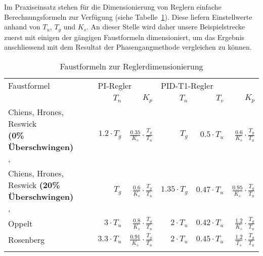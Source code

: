 Im  Praxiseinsatz  stehen  f\"ur  die  Dimensionierung  von  Reglern  einfache
Berechnungsformeln  zur  Verf\"ugung  (siehe  Tabelle~\ref{tab:faustformeln}).
Diese  liefern Einstellwerte  anhand  von $T_u$,  $T_g$  und $K_s$. An  dieser
Stelle wird  daher unsere  Beispielstrecke zuerst  mit einigen  der g\"angigen
Faustformeln dimensioniert, um das Ergebnis anschliessend mit dem Resultat der
Phasengangmethode vergleichen zu k\"onnen.

\begin{longtable}{p{50mm}rrrrr}
    \toprule


    Faustformel
    &
    \multicolumn{2}{l}{PI-Regler}
    &
    \multicolumn{2}{l}{PID-T1-Regler}
    \\

    &
    $T_n$
    &
    $K_p$
    &
    $T_n$
    &
    $T_v$
    &
    $K_p$
    \\

    \midrule

    \endhead
    \endfoot
    \endlastfoot


    \pbox{45mm}{Chiens, Hrones, Reswick \\ \small{\textbf{(0\% \"Uberschwingen)}} \\ \cite{ref:chiens_tsn}, \cite{ref:chiens_wiki}}
    &
    $1.2\cdot T_g$
    &
    $\frac{0.35}{K_s} \cdot \frac{T_g}{T_u}$
    &
    $T_g$
    &
    $0.5\cdot T_u$
    &
    $ \frac{0.6}{K_s} \cdot \frac{T_g}{T_u} $
    \\

    \addlinespace[1em]

    \pbox{45mm}{Chiens, Hrones, Reswick \small{\textbf{(20\% \"Uberschwingen)}} \\ \cite{ref:chiens_tsn}, \cite{ref:chiens_wiki}}
    &
    $T_g$
    &
    $\frac{0.6}{K_s} \cdot \frac{T_g}{T_u}$
    &
    $1.35\cdot T_g$
    &
    $0.47 \cdot T_u$
    &
    $ \frac{0.95}{K_s} \cdot \frac{T_g}{T_u} $
    \\

    \addlinespace[1em]

    Oppelt \cite{ref:op_ros_zieg}
    &
    $3 \cdot T_u$
    &
    $\frac{0.8}{K_s} \cdot \frac{T_g}{T_u}$
    &
    $2 \cdot T_u$
    &
    $ 0.42 \cdot T_u $
    &
    $ \frac{1.2}{K_s} \cdot \frac{T_g}{T_u} $
    \\

    \addlinespace[1em]

    Rosenberg \cite{ref:op_ros_zieg}
    &
    $3.3 \cdot T_u $
    &
    $ \frac{0.91}{K_s} \cdot \frac{T_g}{T_u} $
    &
    $ 2 \cdot T_u $
    &
    $ 0.45 \cdot T_u $
    &
    $ \frac{1.2}{T_s} \cdot \frac{T_g}{T_u}$
    \\

    \addlinespace[1em]

    \bottomrule
\caption{Faustformeln zur Reglerdimensionierung}
\label{tab:faustformeln}
\end{longtable}

